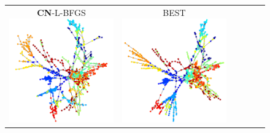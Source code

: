 \documentclass[dvipdfmx,10pt,journal,compsoc]{IEEEtran}
\begin{document}
\begin{figure}[btp]
\begin{tabular}{cccccc}
    \makecell{\small{\textsf{\textbf{CN}-L-BFGS}}                                                                                                        \\[-0.2em]\includegraphics[width=0.27\columnwidth]{individual/vis/1138_bus_CN-L-BFGS.png}} &
    \makecell{\small{\textsf{BEST}}                                                                                                                      \\[-0.2em]\includegraphics[width=0.27\columnwidth]{individual/vis/opt_1138_bus.png}} \\


\end{tabular}
\end{figure}
\end{document}
